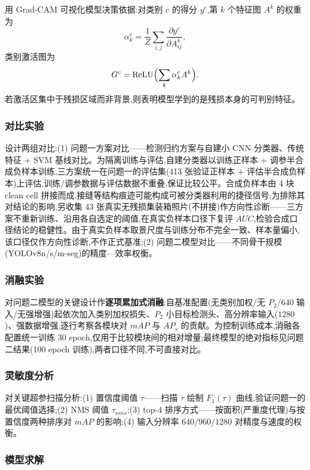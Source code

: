 用 Grad-CAM 可视化模型决策依据:对类别 $c$ 的得分 $y^c$,第 $k$ 个特征图 $A^k$ 的权重为
\[
\alpha_k^c=\frac{1}{Z}\sum_{i,j}\frac{\partial y^c}{\partial A^k_{ij}},
\]
类别激活图为
\[
G^c=\mathrm{ReLU}\Bigl(\sum_k \alpha_k^c A^k\Bigr).
\]
若激活区集中于残损区域而非背景,则表明模型学到的是残损本身的可判别特征。

\subsubsection{对比实验}

设计两组对比:(1) 问题一方案对比——检测归约方案与自建小 CNN 分类器、传统特征 + SVM 基线对比。为隔离训练与评估,自建分类器以训练正样本 + 调参半合成负样本训练,三方案统一在问题一的评估集(413 张验证正样本 + 评估半合成负样本)上评估,训练/调参数据与评估数据不重叠,保证比较公平。合成负样本由 4 块 clean cell 拼接而成,接缝等结构痕迹可能构成可被分类器利用的捷径信号;为排除其对结论的影响,另收集 43 张真实无残损集装箱照片(不拼接)作方向性诊断——三方案不重新训练、沿用各自选定的阈值,在真实负样本口径下复评 $AUC$,检验合成口径结论的稳健性。由于真实负样本取景尺度与训练分布不完全一致、样本量偏小,该口径仅作方向性诊断,不作正式基准;(2) 问题二模型对比——不同骨干规模(YOLOv8n/s/m-seg)的精度—效率权衡。

\subsubsection{消融实验}

对问题二模型的关键设计作\textbf{逐项累加式消融}:自基准配置(无类别加权/无 $P_2$/$640$ 输入/无强增强)起依次加入类别加权损失、$P_2$ 小目标检测头、高分辨率输入($1280$)、强数据增强,逐行考察各模块对 $mAP$ 与 $AP_s$ 的贡献。为控制训练成本,消融各配置统一训练 30 epoch,仅用于比较模块间的相对增量;最终模型的绝对指标见问题二结果(100 epoch 训练),两者口径不同,不可直接对比。

\subsubsection{灵敏度分析}

对关键超参扫描分析:(1) 置信度阈值 $\tau$——扫描 $\tau$ 绘制 $F_1(\tau)$ 曲线,验证问题一的最优阈值选择;(2) NMS 阈值 $\tau_{nms}$;(3) top-4 排序方式——按面积(严重度代理)与按置信度两种排序对 $mAP$ 的影响;(4) 输入分辨率 $640/960/1280$ 对精度与速度的权衡。

\subsubsection{模型求解}

